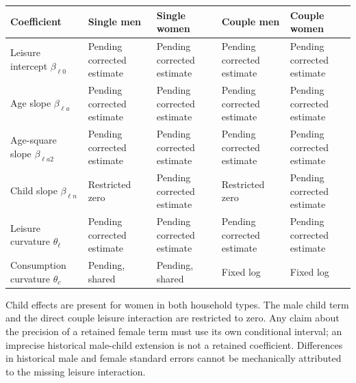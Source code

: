 \documentclass[11pt,a4paper]{article}
\begin{document}
{ %
\small\setlength{\tabcolsep}{3pt}\begin{longtable}[]{@{}
  >{\raggedright\arraybackslash}p{}
  >{\raggedright\arraybackslash}p{}
  >{\raggedright\arraybackslash}p{}
  >{\raggedright\arraybackslash}p{}
  >{\raggedright\arraybackslash}p{}@{}}
\toprule\noalign{}
\begin{minipage}[b]{\linewidth}\raggedright
Coefficient
\end{minipage} & \begin{minipage}[b]{\linewidth}\raggedright
Single men
\end{minipage} & \begin{minipage}[b]{\linewidth}\raggedright
Single women
\end{minipage} & \begin{minipage}[b]{\linewidth}\raggedright
Couple men
\end{minipage} & \begin{minipage}[b]{\linewidth}\raggedright
Couple women
\end{minipage} \\
\midrule\noalign{}
\endhead
\bottomrule\noalign{}
\endlastfoot
Leisure intercept \(\beta_{\ell0}\) & Pending corrected estimate & Pending corrected estimate & Pending corrected estimate & Pending corrected estimate \\
Age slope \(\beta_{\ell a}\) & Pending corrected estimate & Pending corrected estimate & Pending corrected estimate & Pending corrected estimate \\
Age-square slope \(\beta_{\ell a2}\) & Pending corrected estimate & Pending corrected estimate & Pending corrected estimate & Pending corrected estimate \\
Child slope \(\beta_{\ell n}\) & Restricted zero & Pending corrected estimate & Restricted zero & Pending corrected estimate \\
Leisure curvature \(\theta_\ell\) & Pending corrected estimate & Pending corrected estimate & Pending corrected estimate & Pending corrected estimate \\
Consumption curvature \(\theta_c\) & Pending, shared & Pending, shared & Fixed log & Fixed log \\
\end{longtable}
}

Child effects are present for women in both household types. The male child term and the direct couple leisure interaction are restricted to zero. Any claim about the precision of a retained female term must use its own conditional interval; an imprecise historical male-child extension is not a retained coefficient. Differences in historical male and female standard errors cannot be mechanically attributed to the missing leisure interaction.
\end{document}
